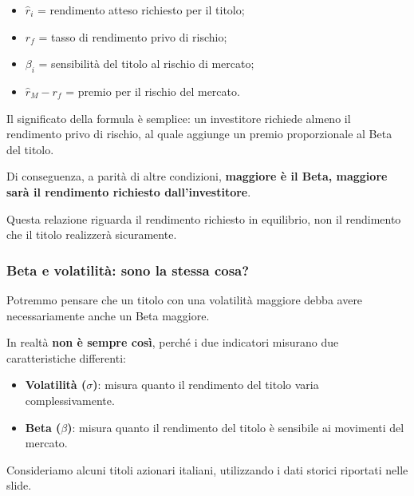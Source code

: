\begin{itemize}
    \item $\hat{r}_i$ = rendimento atteso richiesto
    per il titolo;

    \item $r_f$ = tasso di rendimento
    privo di rischio;

    \item $\beta_i$ = sensibilità del titolo
    al rischio di mercato;

    \item $\hat{r}_M-r_f$ = premio per il rischio
    del mercato.
\end{itemize}

\noindent Il significato della formula è semplice:
un investitore richiede almeno il rendimento
privo di rischio, al quale aggiunge un premio
proporzionale al Beta del titolo.

\medskip

\noindent Di conseguenza, a parità di altre condizioni,
\textbf{maggiore è il Beta, maggiore sarà
il rendimento richiesto dall'investitore}.

\medskip

\noindent Questa relazione riguarda il rendimento
richiesto in equilibrio, non il rendimento
che il titolo realizzerà sicuramente.


\subsubsection*{Beta e volatilità: sono la stessa cosa?}

\noindent Potremmo pensare che un titolo
con una volatilità maggiore debba
avere necessariamente anche un Beta maggiore.

\medskip

\noindent In realtà \textbf{non è sempre così},
perché i due indicatori misurano
due caratteristiche differenti:

\begin{itemize}
    \item \textbf{Volatilità ($\sigma$)}:
    misura quanto il rendimento del titolo
    varia complessivamente.

    \item \textbf{Beta ($\beta$)}:
    misura quanto il rendimento del titolo
    è sensibile ai movimenti del mercato.
\end{itemize}

\noindent Consideriamo alcuni titoli azionari italiani,
utilizzando i dati storici riportati nelle slide.

